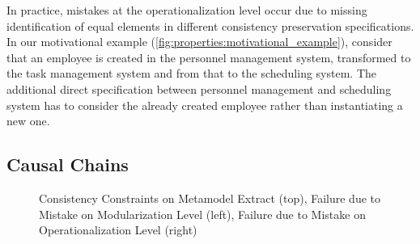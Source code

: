 In practice, mistakes at the operationalization level occur due to missing identification of equal elements in different consistency preservation specifications. 
In our motivational example (\autoref{fig:properties:motivational_example}), %
consider that an employee is created in the personnel management system, transformed to the task management system and from that to the scheduling system.
The additional direct specification between personnel management and scheduling system has to consider the already created employee rather than instantiating a new one.




\subsection{Causal Chains}

\begin{figure}
    \centering
    
    \caption{Consistency Constraints on Metamodel Extract (top), Failure due to Mistake on Modularization Level (left), Failure due to Mistake on Operationalization Level (right)}
    \label{fig:errors:mistake_effects_example}
\end{figure}


